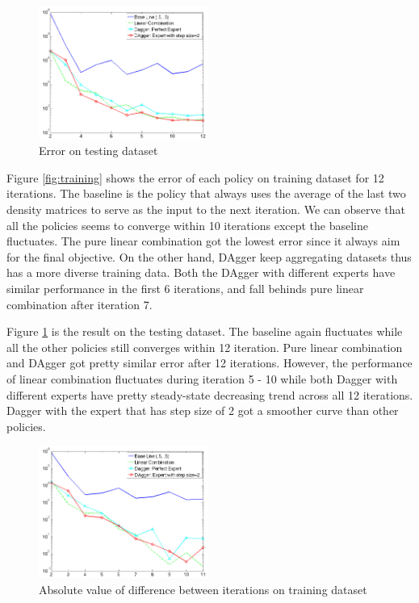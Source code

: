 \documentclass[twoside]{article}
\begin{document}
\begin{figure}[h!]

  \caption{Error on testing dataset}
  \label{fig:testing}
    \includegraphics[width=210px]{Dagger_beta05_testing.jpg}
\end{figure}

Figure \ref{fig:training} shows the error of each policy on training dataset for 12 iterations. The baseline is the policy that always uses the average of the last two density matrices to serve as the input to the next iteration.  We can observe that all the policies seems to  converge within 10 iterations except the baseline fluctuates. The pure linear combination got the lowest error since it always aim for the final objective. On the other hand, DAgger keep aggregating datasets thus has a more diverse training data. Both the DAgger with different experts have similar performance in the first 6 iterations, and fall behinds pure linear combination after iteration 7. 

Figure \ref{fig:testing} is the result  on the testing dataset.
The baseline again fluctuates while all the other policies still converges within 12 iteration. 
Pure linear combination and DAgger got pretty similar error after 12 iterations. However, the performance of linear combination fluctuates during iteration 5 - 10 while both Dagger with different experts have pretty steady-state decreasing trend across all 12 iterations. Dagger with the expert that has step size of 2 got a smoother curve than other policies.


\begin{figure}[h!]
  \caption{Absolute value of difference between iterations on training dataset}
	\label{fig:converge_training}
    \includegraphics[width=210px]{convergence_Training.jpg}
\end{figure}
\end{document}
